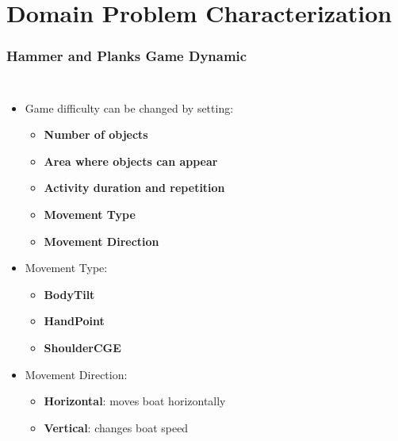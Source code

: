 \documentclass[xcolor=table]{beamer}
\begin{document}
\section{Domain Problem Characterization}
\begin{frame}
\frametitle{Hammer and Planks Game Dynamic}
\begin{columns}[T]
\begin{itemize}
\item Game difficulty can be changed by setting:
\begin{itemize}
\item \textbf{Number of objects}
\item \textbf{Area where objects can appear}
\item \textbf{Activity duration and repetition}
\item \textbf{Movement Type}
\item \textbf{Movement Direction}
\end{itemize}
\item Movement Type:
\begin{itemize}
\item \textbf{BodyTilt}
\item \textbf{HandPoint}
\item \textbf{ShoulderCGE}
\end{itemize}
\item Movement Direction:
\begin{itemize}
\item \textbf{Horizontal}: moves boat horizontally
\item \textbf{Vertical}: changes boat speed
\end{itemize}
\end{itemize}


\end{columns}
\end{frame}
\end{document}
